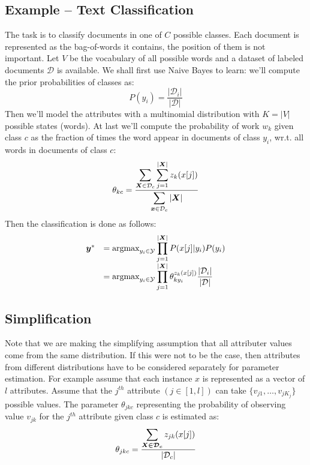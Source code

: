\subsection{Example -- Text Classification}
The task is to classify documents in one of $C$ possible classes. Each document is represented as the bag-of-words it contains, the position of them is not important. Let $V$ be the vocabulary of all possible words and a dataset of labeled documents $\mathcal{D}$ is available. \newline
We shall first use Naive Bayes to learn: we'll compute the prior probabilities of classes as:
\[P(y_i)=\frac{\vert \mathcal{D}_i\vert}{\vert \mathcal{D}\vert}\]
Then we'll model the attributes with a multinomial distribution with $K=\vert V\vert$ possible states (words). At last we'll compute the probability of work $w_k$ given class $c$ as the fraction of times the word appear in documents of class $y_i$, wr.t. all words in documents of class $c$:
\[\theta_{kc}=\dfrac{\displaystyle\sum_{\bm{X}\in\mathcal{D}_c}\displaystyle\sum_{j=1}^{\vert\bm{X}\vert}z_k(x[j])}{\displaystyle\sum_{\bm{x}\in\mathcal{D}_c}\vert\bm{X}\vert}\]
Then the classification is done as follows:
\[
  \begin{array}{ll}
    \bm{y}^*&=\text{argmax}_{y_i\in\mathcal{Y}}\displaystyle\prod_{j=1}^{\vert\bm{X}\vert}P(x[j]\vert y_i)P(y_i)\\
              &=\text{argmax}_{y_i\in\mathcal{Y}}\displaystyle\prod_{j=1}^{\vert\bm{X}\vert}\theta_{ky_i}^{z_k(x[j])}\dfrac{\vert\mathcal{D}_i\vert}{\vert\mathcal{D}\vert}
  \end{array}
\]
%
%
\subsection{Simplification}
Note that we are making the simplifying assumption that all attributer values come from the same distribution. If this were not to be the case, then attributes from different distributions have to be considered separately for parameter estimation. \newline
For example assume that each instance $x$ is represented as a vector of $l$ attributes. Assume that the $j^{th}$ attribute $(j\in[1,l])$ can take $\{v_{j1},\hdots,v_{jK_j}\}$ possible values. The parameter $\theta_{jkc}$ representing the probability of observing value $v_{jk}$ for the $j^{th}$ attribute given class $c$ is estimated as:
\[\theta_{jkc}=\dfrac{\displaystyle\sum_{\bm{X\in\mathcal{D}_c}}z_{jk}(x[j])}{\vert\mathcal{D}_c\vert}\]
%
%
